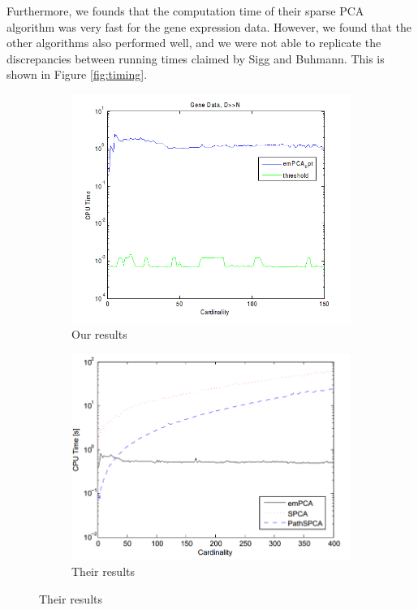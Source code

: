 \documentclass{article}
\begin{document}
Furthermore, we founds that the computation time of their sparse
PCA algorithm was very fast for the gene expression data.
However, we found that the other algorithms also performed well,
and we were not able to replicate the discrepancies between
running times claimed by Sigg and Buhmann.
This is shown in Figure \ref{fig:timing}.

\begin{figure}[H,width=\textwidth]
\caption{Running time versus cardinality}
\label{fig:timing}
\begin{subfigure}{0.5\textwidth}
\caption{Our results}
\includegraphics[width=\textwidth]{6.png}
\end{subfigure}
\begin{subfigure}{0.5\textwidth}
\caption{Their results}
\includegraphics[width=\textwidth]{5.png}
\end{subfigure}
\end{figure}
\end{document}
